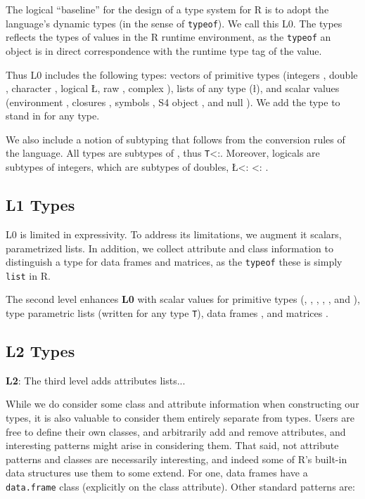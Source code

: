 \documentclass[acmsmall,10pt,review,anonymous]{acmart}\settopmatter{printfolios=true,printccs=false,printacmref=false}
\newcommand{\code}[1]{\lstinline|#1|\xspace}
\begin{document}
The logical ``baseline'' for the design of a type system for R is to adopt
the language's dynamic types (in the sense of \code{typeof}).  We call this
L0.  The types reflects the types of values in the R runtime environment, as
the \code{typeof} an object is in direct correspondence with the runtime
type tag of the value.

Thus L0 includes the following types: vectors of primitive types (integers
\I, double \D, character \C, logical \L, raw \R, complex \X), lists of any
type (\l), and scalar values (environment \sE, closures \sF, symbols \sY, S4
object \sS, and null \sN). We add the type \ANY to stand in for any type.

We also include a notion of subtyping that follows from the conversion rules
of the language.  All types are subtypes of \ANY, thus {\tt T}<:\ANY.
Moreover, logicals are subtypes of integers, which are subtypes of doubles,
\L <: \I <: \D.

\subsection{L1 Types}

L0 is limited in expressivity. To address its limitations, we augment it
scalars, parametrized lists.  In addition, we collect attribute and class
information to distinguish a type for data frames and matrices, as the
\code{typeof} these is simply {\tt list} in R.

The second level enhances {\bf L0} with scalar values for primitive types
(\sI, \sD, \sC, \sL, \sR, and \sX), type parametric lists (written 
for any type {\tt T}), data frames , and matrices
.


\subsection{L2 Types}
 {\bf L2}: The third level adds attributes lists...


While we do consider some class and attribute information when constructing
our types, it is also valuable to consider them entirely separate from
types.  Users are free to define their own classes, and arbitrarily add and
remove attributes, and interesting patterns might arise in considering them.
That said, not attribute patterns and classes are necessarily interesting,
and indeed some of R's built-in data structures use them to some extend.
For one, data frames have a {\tt data.frame} class (explicitly on the class
attribute).  Other standard patterns are:
\end{document}

